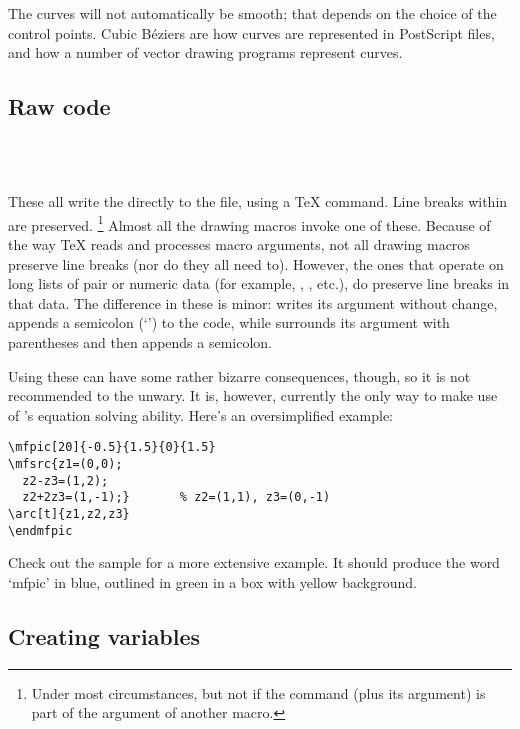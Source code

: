 \documentclass[letterpaper]{article}
\begin{document}
The curves will not automatically be smooth; that depends on the choice
of the control points. Cubic B\'eziers are how curves are represented in
PostScript files, and how a number of vector drawing programs represent
curves.


\subsection{Raw \MF{} code}\label{mfcode}

\begin{cd}
\\
\\
%
%
%
%
\end{cd}

These all write the  directly to the \MF{} file,
using a \TeX{}  command. Line breaks within  are preserved.%
    \footnote{Under most circumstances, but not if the command (plus its
    argument) is part of the argument of another macro.} %
Almost all the \mfp{} drawing macros invoke one of these. Because of the
way \TeX{} reads and processes macro arguments, not all drawing macros
preserve line breaks (nor do they all need to). However, the ones that
operate on long lists of pair or numeric data (for example, ,
, etc.), do preserve line breaks in that data. The difference
in these is minor:  writes its argument without change,
 appends a semicolon (`\mfc{;}') to the code, while
 surrounds its argument with parentheses and then appends a
semicolon.

Using these can have some rather bizarre consequences, though, so it is
not recommended to the unwary. It is, however, currently the only way to
make use of \MF{}'s equation solving ability. Here's an oversimplified
example:
\begin{verbatim}
\mfpic[20]{-0.5}{1.5}{0}{1.5}
\mfsrc{z1=(0,0);
  z2-z3=(1,2);
  z2+2z3=(1,-1);}       % z2=(1,1), z3=(0,-1)
\arc[t]{z1,z2,z3}
\endmfpic
\end{verbatim}

Check out the sample  for a more extensive example. It
should produce the word `\textsf{mfpic}' in blue, outlined in green in a
box with yellow background.


\subsection{Creating \MF{} variables}\label{variables}
\end{document}
